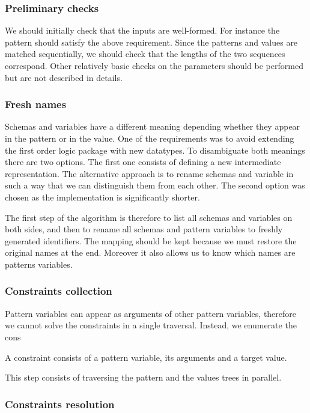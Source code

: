 \subsubsection{Preliminary checks}

We should initially check that the inputs are well-formed. For instance the pattern should satisfy the above requirement. Since the patterns and values are matched sequentially, we should check that the lengths of the two sequences correspond. Other relatively basic checks on the parameters should be performed but are not described in details.

\subsubsection{Fresh names}

Schemas and variables have a different meaning depending whether they appear in the pattern or in the value. One of the requirements was to avoid extending the first order logic package with new datatypes. To disambiguate both meanings there are two options. The first one consists of defining a new intermediate representation. The alternative approach is to rename schemas and variable in such a way that we can distinguish them from each other. The second option was chosen as the implementation is significantly shorter.

The first step of the algorithm is therefore to list all schemas and variables on both sides, and then to rename all schemas and pattern variables to freshly generated identifiers. The mapping should be kept because we must restore the original names at the end. Moreover it also allows us to know which names are patterns variables.

\subsubsection{Constraints collection}

Pattern variables can appear as arguments of other pattern variables, therefore we cannot solve the constraints in a single traversal. Instead, we enumerate the cons

A constraint consists of a pattern variable, its arguments and a target value.

This step consists of traversing the pattern and the values trees in parallel.

\subsubsection{Constraints resolution}

